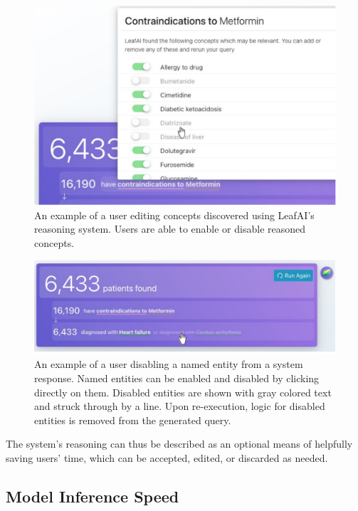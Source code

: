 \documentclass[../main.tex]{subfiles}
\begin{document}
\begin{figure}[h!]
  \centering
  \includegraphics[scale=0.68]{Figures/8_web_application/leafai_edit_concepts.pdf}  
  \caption{An example of a user editing concepts discovered using LeafAI's reasoning system. Users are able to enable or disable reasoned concepts.}
\label{fig_leafai_edit_concepts}
\end{figure}

\begin{figure}[h!]
  \centering
  \includegraphics[scale=0.68]{Figures/8_web_application/leafai_edit_entities.pdf}  
  \caption{An example of a user disabling a named entity from a system response. Named entities can be enabled and disabled by clicking directly on them. Disabled entities are shown with gray colored text and struck through by a line. Upon re-execution, logic for disabled entities is removed from the generated query.}
\label{fig_leafai_edit_entities}
\end{figure}

The system's reasoning can thus be described as an optional means of helpfully saving users' time, which can be accepted, edited, or discarded as needed.

\subsection{Model Inference Speed}
\end{document}
